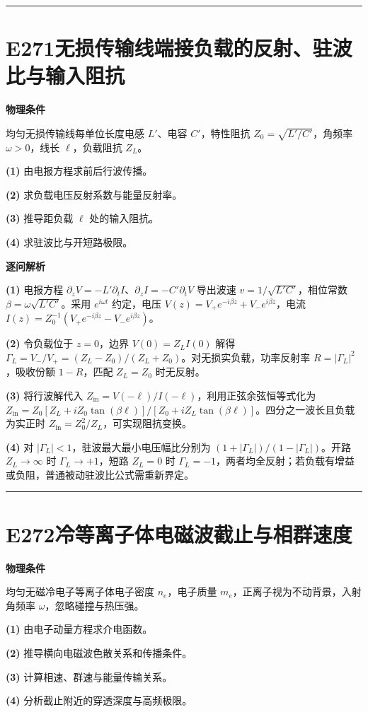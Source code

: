 \documentclass[UTF8,a4paper,11pt,oneside,openany]{ctexbook}
\begin{document}
\par\bigskip\hrule\bigskip
\section*{E271\quad 无损传输线端接负载的反射、驻波比与输入阻抗}
\textbf{物理条件}\par 均匀无损传输线每单位长度电感 \(L'\)、电容 \(C'\)，特性阻抗 \(Z_0=\sqrt{L'/C'}\)，角频率 \(\omega>0\)，线长 \(\ell\)，负载阻抗 \(Z_L\)。
\par\noindent\textbf{(1)} 由电报方程求前后行波传播。
\par\noindent\textbf{(2)} 求负载电压反射系数与能量反射率。
\par\noindent\textbf{(3)} 推导距负载 \(\ell\) 处的输入阻抗。
\par\noindent\textbf{(4)} 求驻波比与开短路极限。

\par\medskip\noindent\textbf{逐问解析}
\par\noindent\textbf{(1)} 电报方程 \(\partial_zV=-L'\partial_tI\)、\(\partial_zI=-C'\partial_tV\) 导出波速 \(v=1/\sqrt{L'C'}\)，相位常数 \(\beta=\omega\sqrt{L'C'}\)。采用 \(e^{i\omega t}\) 约定，电压 \(V(z)=V_+e^{-i\beta z}+V_-e^{i\beta z}\)，电流 \(I(z)=Z_0^{-1}(V_+e^{-i\beta z}-V_-e^{i\beta z})\)。
\par\noindent\textbf{(2)} 令负载位于 \(z=0\)，边界 \(V(0)=Z_LI(0)\) 解得 \(\Gamma_L=V_-/V_+=(Z_L-Z_0)/(Z_L+Z_0)\)。对无损实负载，功率反射率 \(R=|\Gamma_L|^2\)，吸收份额 \(1-R\)，匹配 \(Z_L=Z_0\) 时无反射。
\par\noindent\textbf{(3)} 将行波解代入 \(Z_{\mathrm{in}}=V(-\ell)/I(-\ell)\)，利用正弦余弦恒等式化为 \(Z_{\mathrm{in}}=Z_0[Z_L+iZ_0\tan(\beta\ell)]/[Z_0+iZ_L\tan(\beta\ell)]\)。四分之一波长且负载为实正时 \(Z_{\mathrm{in}}=Z_0^2/Z_L\)，可实现阻抗变换。
\par\noindent\textbf{(4)} 对 \(|\Gamma_L|<1\)，驻波最大最小电压幅比分别为 \((1+|\Gamma_L|)/(1-|\Gamma_L|)\)。开路 \(Z_L\to\infty\) 时 \(\Gamma_L\to+1\)，短路 \(Z_L=0\) 时 \(\Gamma_L=-1\)，两者均全反射；若负载有增益或负阻，普通被动驻波比公式需重新界定。

\par\bigskip\hrule\bigskip
\section*{E272\quad 冷等离子体电磁波截止与相群速度}
\textbf{物理条件}\par 均匀无磁冷电子等离子体电子密度 \(n_e\)，电子质量 \(m_e\)，正离子视为不动背景，入射角频率 \(\omega\)，忽略碰撞与热压强。
\par\noindent\textbf{(1)} 由电子动量方程求介电函数。
\par\noindent\textbf{(2)} 推导横向电磁波色散关系和传播条件。
\par\noindent\textbf{(3)} 计算相速、群速与能量传输关系。
\par\noindent\textbf{(4)} 分析截止附近的穿透深度与高频极限。
\end{document}
